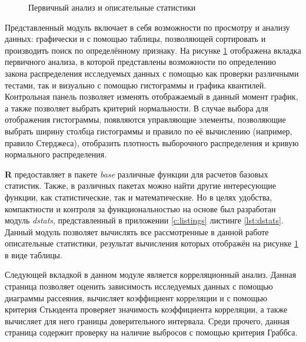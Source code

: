 \begin{figure}[ht]
\caption{Первичный анализ и описательные статистики}
\label{img:mod_basis}
\end{figure}
Представленный модуль включает в себя возможности по просмотру и анализу данных: графически и с помощью таблицы, позволяющей сортировать и производить поиск по определённому признаку. На рисунке \ref{img:mod_basis} отображена вкладка первичного анализа, в которой представлены возможности по определению закона распределения исследуемых данных с помощью как проверки различными тестами, так и визуально с помощью гистограммы и графика квантилей. Контрольная панель позволяет изменять отображаемый в данный момент график, а также позволяет выбрать критерий нормальности. В случае выбора для отображения гистограммы, появляются управляющие элементы, позволяющие выбрать ширину столбца гистограммы и правило по её вычислению (например, правило Стерджеса), отобразить плотность выборочного распределения и кривую нормального распределения.

\textbf{R} предоставляет в пакете \textit{base} различные функции для расчетов базовых статистик. Также, в различных пакетах можно найти другие интересующие функции, как статистические, так и математические. Но в целях удобства, компактности и контроля за функциональностью на основе \cite{Eliseeva1995, Cramer1997} был разработан модуль \textit{dstats}, представленный в приложении \ref{c:listings} листинге \ref{lst:dstats}. Данный модуль позволяет вычислять все рассмотренные в данной работе описательные статистики, результат вычисления которых отображён на рисунке \ref{img:mod_basis} в виде таблицы.

Следующей вкладкой в данном модуле является корреляционный анализ. Данная страница позволяет оценить зависимость исследуемых данных с помощью диаграммы рассеяния, вычисляет коэффициент корреляции и с помощью критерия Стьюдента проверяет значимость коэффициента корреляции, а также вычисляет для него границы доверительного интервала. Среди прочего, данная страница содержит проверку на наличие выбросов с помощью критерия Граббса.

